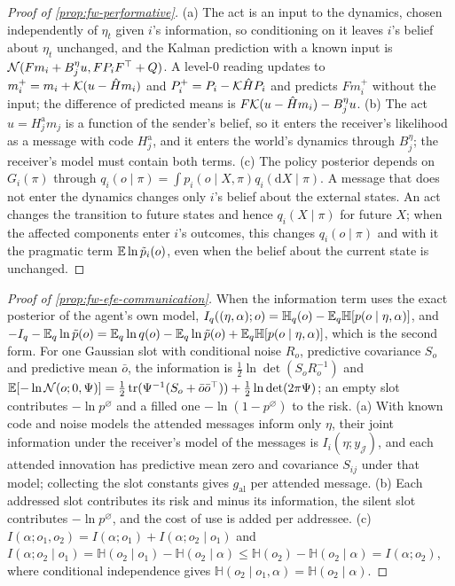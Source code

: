 \begin{proof}[Proof of \cref{prop:fw-performative}]
(a) The act is an input to the dynamics, chosen independently of $\eta_t$ given $i$'s information, so conditioning on it leaves $i$'s belief about $\eta_t$ unchanged, and the Kalman prediction with a known input is $\mathcal{N}(Fm_i+B^\eta_ju,FP_iF^\top+Q)$. A level-0 reading updates to $m_i^+=m_i+\mathcal{K}(u-\hat Hm_i)$ and $P_i^+=P_i-\mathcal{K}\hat HP_i$ and predicts $Fm_i^+$ without the input; the difference of predicted means is $F\mathcal{K}(u-\hat Hm_i)-B^\eta_ju$. (b) The act $u=H^{\mathrm a}_jm_j$ is a function of the sender's belief, so it enters the receiver's likelihood as a message with code $H^{\mathrm a}_j$, and it enters the world's dynamics through $B^\eta_j$; the receiver's model must contain both terms. (c) The policy posterior depends on $G_i(\pi)$ through $q_i(o\mid\pi)=\int p_i(o\mid X,\pi)q_i(\mathrm dX\mid\pi)$. A message that does not enter the dynamics changes only $i$'s belief about the external states. An act changes the transition to future states and hence $q_i(X\mid\pi)$ for future $X$; when the affected components enter $i$'s outcomes, this changes $q_i(o\mid\pi)$ and with it the pragmatic term $\mathbb{E}\ln\tilde p_i(o)$, even when the belief about the current state is unchanged.
\end{proof}

\begin{proof}[Proof of \cref{prop:fw-efe-communication}]
When the information term uses the exact posterior of the agent's own model, $I_q((\eta,\alpha);o)=\mathbb H_q(o)-\mathbb{E}_q\mathbb H[p(o\mid\eta,\alpha)]$, and $-I_q-\mathbb{E}_q\ln\tilde p(o)=\mathbb{E}_q\ln q(o)-\mathbb{E}_q\ln\tilde p(o)+\mathbb{E}_q\mathbb H[p(o\mid\eta,\alpha)]$, which is the second form. For one Gaussian slot with conditional noise $R_o$, predictive covariance $S_o$ and predictive mean $\bar o$, the information is $\tfrac12\ln\det(S_oR_o^{-1})$ and $\mathbb{E}[-\ln\mathcal{N}(o;0,\Psi)]=\tfrac12\operatorname{tr}(\Psi^{-1}(S_o+\bar o\bar o^\top))+\tfrac12\ln\det(2\pi\Psi)$; an empty slot contributes $-\ln p^\varnothing$ and a filled one $-\ln(1-p^\varnothing)$ to the risk. (a) With known code and noise models the attended messages inform only $\eta$, their joint information under the receiver's model of the messages is $I_i(\eta;y_{\mathcal J})$, and each attended innovation has predictive mean zero and covariance $S_{ij}$ under that model; collecting the slot constants gives $g_{\mathrm{al}}$ per attended message. (b) Each addressed slot contributes its risk and minus its information, the silent slot contributes $-\ln p^\varnothing$, and the cost of use is added per addressee. (c) $I(\alpha;o_1,o_2)=I(\alpha;o_1)+I(\alpha;o_2\mid o_1)$ and $I(\alpha;o_2\mid o_1)=\mathbb H(o_2\mid o_1)-\mathbb H(o_2\mid\alpha)\le\mathbb H(o_2)-\mathbb H(o_2\mid\alpha)=I(\alpha;o_2)$, where conditional independence gives $\mathbb H(o_2\mid o_1,\alpha)=\mathbb H(o_2\mid\alpha)$.
\end{proof}

